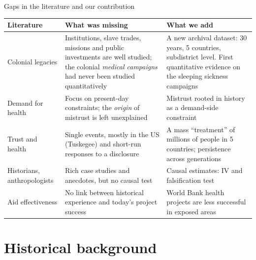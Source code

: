 \documentclass[aspectratio=1610]{beamer}
\begin{document}
\begin{frame}{Gaps in the literature and our contribution}
  \footnotesize
  \renewcommand{\arraystretch}{1.25}
  \begin{tabular}{@{}>{\raggedright\arraybackslash}p{}
                    >{\raggedright\arraybackslash}p{}
                    >{\raggedright\arraybackslash}p{}@{}}
    \toprule
    \textbf{Literature} & \textbf{What was missing} & \textbf{What we add} \\
    \midrule
    Colonial legacies &
      Institutions, slave trades, missions and public investments are well studied; the colonial \emph{medical campaigns} had never been studied quantitatively &
      A new archival dataset: 30 years, 5 countries, subdistrict level. First quantitative evidence on the sleeping sickness campaigns \\
    Demand for health &
      Focus on present-day constraints; the \emph{origin} of mistrust is left unexplained &
      Mistrust rooted in history as a demand-side constraint \\
    Trust and health &
      Single events, mostly in the US (Tuskegee) and short-run responses to a disclosure &
      A mass ``treatment'' of millions of people in 5 countries; persistence across generations \\
    Historians, anthropologists &
      Rich case studies and anecdotes, but no causal test &
      Causal estimates: IV and falsification test \\
    Aid effectiveness &
      No link between historical experience and today's project success &
      World Bank health projects are less successful in exposed areas \\
    \bottomrule
  \end{tabular}
\end{frame}

\section{Historical background}
\end{document}
